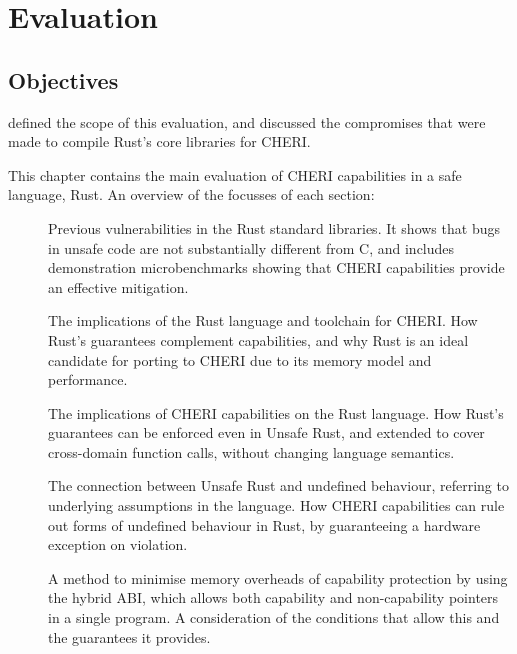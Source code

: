 \documentclass[dissertation.tex]{subfiles}
\begin{document}
\chapter{Evaluation}
\label{ch:eval}

\section{Objectives}
 defined the scope of this evaluation, and
discussed the compromises that were made to compile Rust's core
libraries for CHERI.

This chapter contains the main evaluation of CHERI capabilities in a
safe language, Rust.
An overview of the focusses of each section:

\begin{description}
    \item[]
    Previous vulnerabilities in the Rust standard libraries.
    It shows that bugs in unsafe code are not substantially different
    from C, and includes demonstration microbenchmarks showing that
    CHERI capabilities provide an effective mitigation.

    \item[]
    The implications of the Rust language and toolchain for CHERI.
    How Rust's guarantees complement capabilities, and why Rust is an
    ideal candidate for porting to CHERI due to its memory model and
    performance.

    \item[]
    The implications of CHERI capabilities on the Rust language.
    How Rust's guarantees can be enforced even in Unsafe Rust, and
    extended to cover cross-domain function calls, without changing
    language semantics.

    \item[]
    The connection between Unsafe Rust and undefined behaviour,
    referring to underlying assumptions in the language.
    How CHERI capabilities can rule out forms of undefined behaviour in
    Rust, by guaranteeing a hardware exception on violation.

    \item[]
    A method to minimise memory overheads of capability protection by
    using the hybrid ABI, which allows both capability and
    non-capability pointers in a single program.
    A consideration of the conditions that allow this and the guarantees
    it provides.


\end{description}
\end{document}
